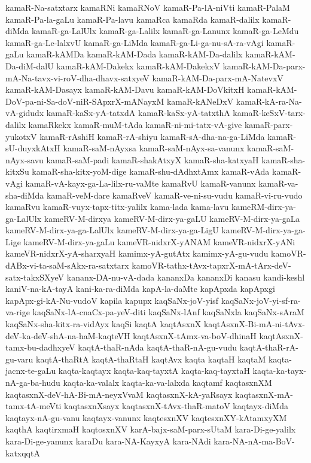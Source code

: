 {kamaR-Na-satxtarx
kamaRNi
kamaRNoV
kamaR-Pa-lA-niVti
kamaR-PalaM
kamaR-Pa-la-gaLu
kamaR-Pa-lavu
kamaRca
kamaRda
kamaR-dalilx
kamaR-diMda
kamaR-ga-LalUlx
kamaR-ga-Lalilx
kamaR-ga-Lanunx
kamaR-ga-LeMdu
kamaR-ga-Le-lalxvU
kamaR-ga-LiMda
kamaR-ga-Li-ga-nu-sA-ra-vAgi
kamaR-gaLu
kamaR-kAMDa
kamaR-kAM-Dada
kamaR-kAM-Da-dalilx
kamaR-kAM-Da-diM-dalU
kamaR-kAM-Dakekx
kamaR-kAM-DakekxV
kamaR-kAM-Da-parx-mA-Na-tavx-vi-roV-dha-dhavx-satxyeV
kamaR-kAM-Da-parx-mA-NatevxV
kamaR-kAM-Dasayx
kamaR-kAM-Davu
kamaR-kAM-DoVkitxH
kamaR-kAM-DoV-pa-ni-Sa-doV-niR-SApxrX-mANayxM
kamaR-kANeDxV
kamaR-kA-ra-Na-vA-gidudx
kamaR-kaSx-yA-tatxdA
kamaR-kaSx-yA-tatxthA
kamaR-keSxV-tarx-dalilx
kamaRkekx
kamaR-muM-tAda
kamaR-ni-mi-tatx-vA-give
kamaR-parx-yukotxV
kamaR-rAshiH
kamaR-rA-shiyu
kamaR-sA-dha-na-ga-LiMda
kamaR-sU-duyxkAtxH
kamaR-saM-nAyxsa
kamaR-saM-nAyx-sa-vanunx
kamaR-saM-nAyx-savu
kamaR-saM-padi
kamaR-shakAtxyX
kamaR-sha-katxyaH
kamaR-sha-kitxSu
kamaR-sha-kitx-yoM-dige
kamaR-shu-dAdhxtAmx
kamaR-vAda
kamaR-vAgi
kamaR-vA-kayx-ga-La-lilx-ru-vaMte
kamaRvU
kamaR-vanunx
kamaR-va-sha-diMda
kamaR-veM-dare
kamaRveV
kamaR-ve-ni-su-vudu
kamaR-vi-ru-vudo
kamaRvu
kamaR-vuyx-tapx-titx-yalilx
kama-lada
kama-lavu
kameRM-dirx-ya-ga-LalUlx
kameRV-M-dirxya
kameRV-M-dirx-ya-gaLU
kameRV-M-dirx-ya-gaLa
kameRV-M-dirx-ya-ga-LalUlx
kameRV-M-dirx-ya-ga-LigU
kameRV-M-dirx-ya-ga-Lige
kameRV-M-dirx-ya-gaLu
kameVR-nidxrX-yANAM
kameVR-nidxrX-yANi
kameVR-nidxrX-yA-sharxyaH
kamimx-yA-gutAtx
kamimx-yA-gu-vudu
kamoVR-dABx-vi-ta-saM-sAkx-ra-satxtarx
kamoVR-tathx-tAvx-tapxrX-mA-tArx-deV-satx-takxSXyeV
kananx-DA-nu-vA-dada
kananxDa
kananxDi
kanasu
kandi-keshl
kaniV-na-kA-tayA
kani-ka-ra-diMda
kapA-la-daMte
kapApxda
kapApxgi
kapApx-gi-kA-Nu-vudoV
kapila
kapupx
kaqSaNx-joV-yisf
kaqSaNx-joV-yi-sf-ra-va-rige
kaqSaNx-lA-cnaCx-pa-yeV-diti
kaqSaNx-lAnf
kaqSaNxla
kaqSaNx-sAraM
kaqSaNx-sha-kitx-ra-vidAyx
kaqSi
kaqtA
kaqtAsxnX
kaqtAsxnX-Bi-mA-ni-tAvx-deV-ka-deV-shA-na-haM-kaqteVH
kaqtAsxnX-tAmx-va-boV-dhinaH
kaqtAsxnX-tamx-bu-dadhxyeV
kaqtA-thaR-nAda
kaqtA-thaR-nA-gu-vudu
kaqtA-thaR-rA-gu-varu
kaqtA-thaRtA
kaqtA-thaRtaH
kaqtAvx
kaqta
kaqtaH
kaqtaM
kaqta-jacnx-te-gaLu
kaqta-kaqtayx
kaqta-kaq-tayxtA
kaqta-kaq-tayxtaH
kaqta-ka-tayx-nA-ga-ba-hudu
kaqta-ka-valalx
kaqta-ka-va-lalxda
kaqtamf
kaqtasxnXM
kaqtasxnX-deV-hA-Bi-mA-neyxVvaM
kaqtasxnX-kA-yaRsayx
kaqtasxnX-mA-tamx-tA-meVti
kaqtasxnXsayx
kaqtasxnX-tAvx-thaR-matoV
kaqtayx-diMda
kaqtayx-nA-gu-vanu
kaqtayx-vanunx
kaqtesxnXV
kaqtesxnXY-kAtamxyXM
kaqthA
kaqtirxmaH
kaqtosxnXV
karA-bajx-saM-parx-sUtaM
kara-Di-ge-yalilx
kara-Di-ge-yanunx
karaDu
kara-NA-KayxyA
kara-NAdi
kara-NA-nA-ma-BoV-katxqqtA
}
